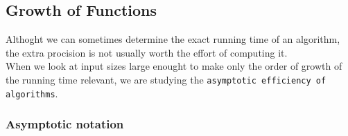 \documentclass[11pt]{article}
\begin{document}
\subsection{Growth of Functions}
\label{sec-2-3}
Althoght we can sometimes determine the exact running time of an algorithm, the extra procision is not usually worth the effort of computing it. \\


When we look at input sizes large enought to make only the order of growth of the running time relevant, we are studying the \texttt{asymptotic efficiency of algorithms}. \\
\subsubsection{Asymptotic notation}
\label{sec-2-3-1}
\end{document}
